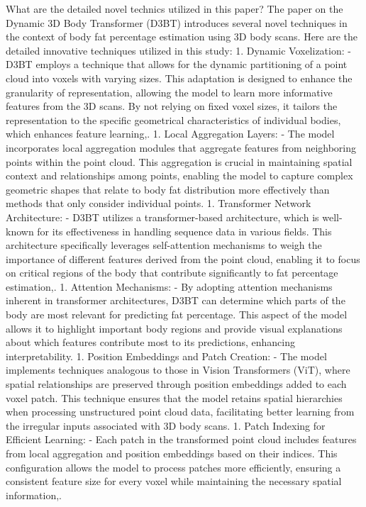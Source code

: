 \documentclass[conference, 12pt]{IEEEtran}
\begin{document}
What are the detailed novel technics utilized in this paper?
The paper on the Dynamic 3D Body Transformer (D3BT) introduces several novel techniques in the context of body fat percentage estimation using 3D body scans. Here are the detailed innovative techniques utilized in this study:
1. Dynamic Voxelization:
- D3BT employs a technique that allows for the dynamic partitioning of a point cloud into voxels with varying sizes. This adaptation is designed to enhance the granularity of representation, allowing the model to learn more informative features from the 3D scans. By not relying on fixed voxel sizes, it tailors the representation to the specific geometrical characteristics of individual bodies, which enhances feature learning,.
1. Local Aggregation Layers:
- The model incorporates local aggregation modules that aggregate features from neighboring points within the point cloud. This aggregation is crucial in maintaining spatial context and relationships among points, enabling the model to capture complex geometric shapes that relate to body fat distribution more effectively than methods that only consider individual points.
1. Transformer Network Architecture:
- D3BT utilizes a transformer-based architecture, which is well-known for its effectiveness in handling sequence data in various fields. This architecture specifically leverages self-attention mechanisms to weigh the importance of different features derived from the point cloud, enabling it to focus on critical regions of the body that contribute significantly to fat percentage estimation,.
1. Attention Mechanisms:
- By adopting attention mechanisms inherent in transformer architectures, D3BT can determine which parts of the body are most relevant for predicting fat percentage. This aspect of the model allows it to highlight important body regions and provide visual explanations about which features contribute most to its predictions, enhancing interpretability.
1. Position Embeddings and Patch Creation:
- The model implements techniques analogous to those in Vision Transformers (ViT), where spatial relationships are preserved through position embeddings added to each voxel patch. This technique ensures that the model retains spatial hierarchies when processing unstructured point cloud data, facilitating better learning from the irregular inputs associated with 3D body scans.
1. Patch Indexing for Efficient Learning:
- Each patch in the transformed point cloud includes features from local aggregation and position embeddings based on their indices. This configuration allows the model to process patches more efficiently, ensuring a consistent feature size for every voxel while maintaining the necessary spatial information,.
\end{document}
